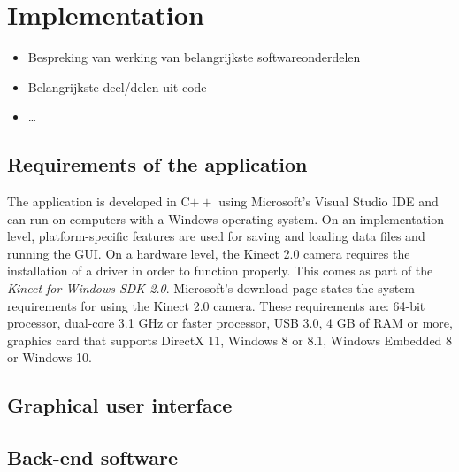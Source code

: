 \chapter{Implementation}

\begin{itemize}
\item Bespreking van werking van belangrijkste softwareonderdelen
\item Belangrijkste deel/delen uit code
\item \ldots
\end{itemize}


\section{Requirements of the application}

The application is developed in C$++$ using Microsoft's Visual Studio IDE and can run on computers with a Windows operating system. On an implementation level, platform-specific features are used for saving and loading data files and running the GUI. On a hardware level, the Kinect 2.0 camera requires the installation of a driver in order to function properly. This comes as part of the \emph{Kinect for Windows SDK 2.0}. Microsoft's download page states the system requirements for using the Kinect 2.0 camera. These requirements are: 64-bit processor, dual-core 3.1 GHz or faster processor, USB 3.0, 4 GB of RAM or more, graphics card that supports DirectX 11, Windows 8 or 8.1, Windows Embedded 8 or Windows 10.\\


\section{Graphical user interface}




\section{Back-end software}

